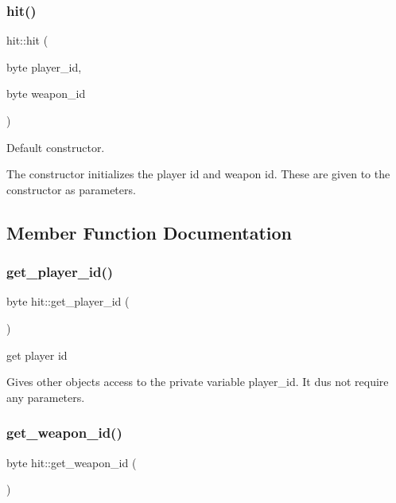 \subsubsection{\texorpdfstring{hit()}{hit()}}
{\footnotesize\ttfamily hit\+::hit (\begin{DoxyParamCaption}\item[{byte}]{player\+\_\+id,  }\item[{byte}]{weapon\+\_\+id }\end{DoxyParamCaption})\hspace{0.3cm}{\ttfamily [inline]}}



Default constructor. 

The constructor initializes the player id and weapon id. These are given to the constructor as parameters. 

\subsection{Member Function Documentation}
\hypertarget{classhit_a914b4442560954de4de27f85f6168919}{}\label{classhit_a914b4442560954de4de27f85f6168919} 
\subsubsection{\texorpdfstring{get\+\_\+player\+\_\+id()}{get\_player\_id()}}
{\footnotesize\ttfamily byte hit\+::get\+\_\+player\+\_\+id (\begin{DoxyParamCaption}{ }\end{DoxyParamCaption})\hspace{0.3cm}{\ttfamily [inline]}}



get player id 

Gives other objects access to the private variable player\+\_\+id. It dus not require any parameters. \hypertarget{classhit_afba4878708b2c56bddf39cfb90c1a4d9}{}\label{classhit_afba4878708b2c56bddf39cfb90c1a4d9} 
\subsubsection{\texorpdfstring{get\+\_\+weapon\+\_\+id()}{get\_weapon\_id()}}
{\footnotesize\ttfamily byte hit\+::get\+\_\+weapon\+\_\+id (\begin{DoxyParamCaption}{ }\end{DoxyParamCaption})\hspace{0.3cm}{\ttfamily [inline]}}



